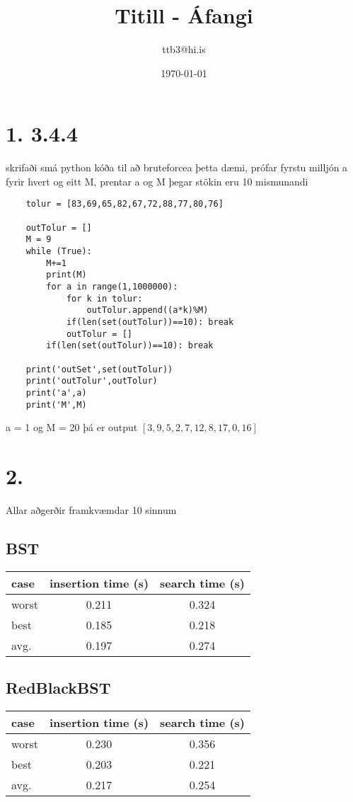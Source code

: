 \documentclass{article}
\title{Titill - Áfangi}
\author{ttb3@hi.is}
\date{\today}
\begin{document}
\maketitle


\section*{1. 3.4.4}
skrifaði smá python kóða til að bruteforcea þetta dæmi, prófar fyrstu milljón a fyrir hvert og eitt M,
prentar a og M þegar stökin eru 10 mismunandi
\begin{lstlisting}
    tolur = [83,69,65,82,67,72,88,77,80,76]

    outTolur = []
    M = 9
    while (True):
        M+=1
        print(M)
        for a in range(1,1000000):
            for k in tolur:
                outTolur.append((a*k)%M)
            if(len(set(outTolur))==10): break
            outTolur = []
        if(len(set(outTolur))==10): break

    print('outSet',set(outTolur))
    print('outTolur',outTolur)
    print('a',a)
    print('M',M)
\end{lstlisting}
a = 1 og M = 20
þá er output $[3, 9, 5, 2, 7, 12, 8, 17, 0, 16]$

\newpage
\section*{2.}
Allar aðgerðir framkvæmdar 10 sinnum
\subsection*{BST}
\begin{tabular}{|l|c|c|}
    \hline
    case&insertion time (s)&search time (s)\\
    \hline
    worst&0.211&0.324\\
    \hline
    best&0.185&0.218\\
    \hline
    avg.&0.197&0.274\\
    \hline
\end{tabular}

\subsection*{RedBlackBST}
\begin{tabular}{|l|c|c|}
    \hline
    case&insertion time (s)&search time (s)\\
    \hline
    worst&0.230&0.356\\
    \hline
    best&0.203&0.221\\
    \hline
    avg.&0.217&0.254\\
    \hline
\end{tabular}
\end{document}

